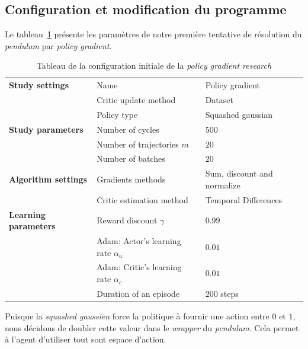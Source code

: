 \subsection{Configuration et modification du programme}

Le tableau~\ref{tab:initial_settings} présente les paramètres de notre première tentative de résolution du \emph{pendulum} par \emph{policy gradient}.

\begin{table}[H]
        \centering
        \begin{tabular}{@{}l l l@{}}
            \toprule
            \textbf{Study settings} & Name & Policy gradient \\
            & Critic update method & Dataset \\
            & Policy type & Squashed gaussian \\ \midrule
            \textbf{Study parameters} & Number of cycles & $ 500 $ \\
            & Number of trajectories $ m $ & $ 20 $ \\
            & Number of batches & $ 20 $ \\ \midrule
            \textbf{Algorithm settings} & Gradients methods & Sum, discount and normalize \\
            & Critic estimation method & Temporal Differences \\ \midrule
            \textbf{Learning parameters} & Reward discount $ \gamma $ & $ 0.99 $ \\
            & Adam: Actor's learning rate $ \alpha_{a} $ & $ 0.01 $ \\
            & Adam: Critic's learning rate $ \alpha_{c} $ & $ 0.01 $ \\
            & Duration of an episode & $ 200 $ steps \\
            \bottomrule
        \end{tabular}
    \caption{Tableau de la configuration initiale de la \emph{policy gradient research}}\label{tab:initial_settings}
\end{table}

Puisque la \emph{squashed gaussien} force la politique à fournir une action
entre  $ 0 $ et $ 1 $, nous décidons de doubler cette valeur dans le
\emph{wrapper} du \emph{pendulum}. Cela permet à l'agent d'utiliser tout sont
espace d'action.

